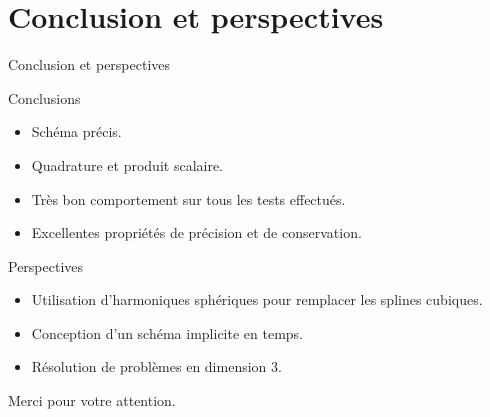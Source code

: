 \documentclass[11pt]{beamer}
\begin{document}
\section{Conclusion et perspectives}
\begin{frame}{Conclusion et perspectives}
\begin{block}{Conclusions}
\begin{itemize}
\item Schéma précis.
\item Quadrature et produit scalaire.
\item Très bon comportement sur tous les tests effectués.
\item Excellentes propriétés de précision et de conservation.
\end{itemize}
\end{block}

\begin{block}{Perspectives}
\begin{itemize}
\item Utilisation d'harmoniques sphériques pour remplacer les splines cubiques.
\item Conception d'un schéma implicite en temps.
\item Résolution de problèmes en dimension 3.
\end{itemize}
\end{block}
\end{frame}


\begin{frame}
\begin{center}
Merci pour votre attention.
\end{center}
\end{frame}
\end{document}
